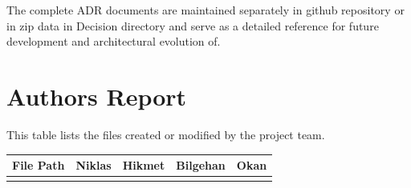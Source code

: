 \documentclass[11pt,a4paper]{article}
\begin{document}
\vspace{0.5em}
The complete ADR documents are maintained separately in github repository or in zip data in Decision directory and serve as a detailed reference for future development and architectural evolution of.

\newpage
\section{Authors Report}
This table lists the files created or modified by the project team.
\\
\begin{longtable}{|p{}|c|c|c|c|}
\hline
\textbf{File Path} & \textbf{Niklas} & \textbf{Hikmet} & \textbf{Bilgehan} & \textbf{Okan} \\
\hline
\endhead
\hline
\endfoot



\end{longtable}
\end{document}
